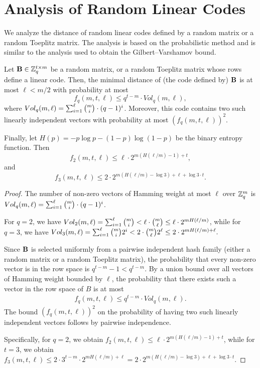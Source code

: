 \section{Analysis of Random Linear Codes}
\label{app:distance}

We analyze the distance of random linear codes defined by a random matrix
or a random Toeplitz matrix.
The analysis is based on the probabilistic method and is
similar to the analysis used to obtain the Gilbert–Varshamov bound.

\begin{proposition}
\label{prop:hw}
Let $\mat{B} \in \Z^{t \times m}_{q}$ be a random matrix, or a random Toeplitz matrix whose rows define
a linear code.
Then, the minimal distance of (the code defined by) $\mat{B}$ is at most $\ell < m/2$ with probability at most
$$f_q(m,t,\ell) \leq q^{t-m} \cdot Vol_q(m,\ell),$$
where $Vol_q(m,\ell) = \sum_{i=1}^\ell \tbinom{m}{i} \cdot (q-1)^{i}$.
Moreover, this code contains two such linearly independent vectors with probability at most $(f_q(m,t,\ell))^2$.

Finally, let $H(p) = - p \log p - (1-p) \log(1-p)$ be the binary entropy function.
Then
$$f_2(m,t,\ell) \leq \ell \cdot 2^{m (H(\ell/m) - 1) + t},$$
and
$$f_3(m,t,\ell) \leq 2 \cdot 2^{m (H(\ell/m) - \log 3) + \ell + \log 3 \cdot t}.$$
\end{proposition}

\begin{proof}The number of non-zero vectors of Hamming weight at most $\ell$ over $\mathbb{Z}_q^m$ is
$Vol_q(m,\ell) = \sum_{i=1}^\ell \tbinom{m}{i} \cdot (q-1)^{i}$.

For $q = 2$, we have
$Vol_2(m,\ell) = \sum_{i=1}^\ell \tbinom{m}{i} <
\ell \cdot \tbinom{m}{\ell} \leq
\ell \cdot 2^{m H(\ell/m)}$, while for $q = 3$, we have
$Vol_3(m,\ell) = \sum_{i=1}^\ell \tbinom{m}{i} 2^i <
2 \cdot \tbinom{m}{\ell} 2^\ell \leq
2 \cdot 2^{m H(\ell/m) + \ell}.$

Since $\mat{B}$ is selected uniformly from a pairwise independent hash family (either a random matrix or a random Toeplitz matrix),
the probability that every non-zero vector is in the row space is $q^{t-m} - 1 < q^{t-m}$. By a union bound over all vectors of Hamming weight bounded by $\ell$, the probability that there exists such a vector in the row space of $B$ is at most
\begin{align*}
f_q(m,t,\ell) \leq q^{t-m} \cdot Vol_q(m,\ell).
\end{align*}
The bound $(f_q(m,t,\ell))^2$ on the probability of having two such linearly independent vectors follows by pairwise independence.

Specifically, for $q = 2$, we obtain
$f_2(m,t,\ell) \leq \ell \cdot 2^{m (H(\ell/m) - 1) + t}$,
while for $t = 3$, we obtain
$f_3(m,t,\ell) \leq 2 \cdot 3^{t-m} \cdot 2^{m H(\ell/m) + \ell} = 2 \cdot 2^{m (H(\ell/m) - \log 3) + \ell + \log 3 \cdot t}$.
\end{proof}


